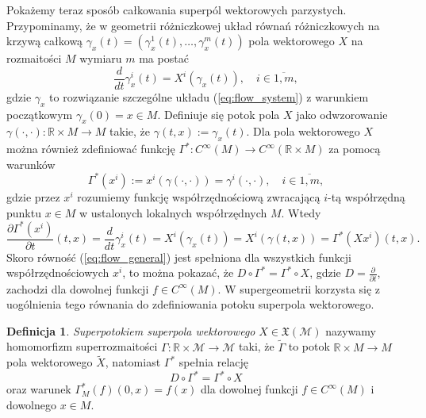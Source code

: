 \documentclass[11pt,a4paper]{report}
\theoremstyle{definition}
\newtheorem{definition}[theorem]{Definicja}
\begin{document}
Pokażemy teraz sposób całkowania superpól wektorowych parzystych. Przypominamy, że w geometrii różniczkowej układ równań różniczkowych na krzywą całkową $\gamma_x (t) = (\gamma_x ^1(t), \ldots, \gamma_x ^m (t))$ pola wektorowego $X$ na rozmaitości $M$ wymiaru $m$ ma postać
\begin{equation}
\label{eq:flow_system}
 \frac{d}{dt}\gamma_{x}^i(t)=X^i(\gamma_{x}(t)), \quad i \in \overline{1,m},
\end{equation}
gdzie $\gamma_{x}$ to rozwiązanie szczególne układu (\ref{eq:flow_system}) z warunkiem początkowym $\gamma_x(0) = x \in M.$ Definiuje się potok pola $X$ jako odwzorowanie $\gamma(\cdot, \cdot): \mathbb{R} \times M \rightarrow M$ takie, że $\gamma(t, x) := \gamma_x (t).$ Dla pola wektorowego $X$ można również zdefiniować funkcję $\Gamma^* : C^\infty (M) \rightarrow C^\infty (\mathbb{R} \times M)$ za pomocą warunków
\begin{equation*}
 \Gamma^*(x^i) := x^i(\gamma(\cdot, \cdot)) =  \gamma^i(\cdot, \cdot), \quad i \in \overline{1,m},
\end{equation*}
gdzie przez $x^i$ rozumiemy funkcję współrzędnościową zwracającą $i$-tą współrzędną punktu $x\in M$ w ustalonych lokalnych współrzędnych $M$. Wtedy
\begin{equation}
\label{eq:flow_general}
\frac{\partial \Gamma^*(x^i)}{\partial t}(t, x) 
= \frac{d}{dt} \gamma^i_x(t) = X^i(\gamma_x(t)) = X^i(\gamma(t,x))=\Gamma^*(Xx^i) (t,x). 
\end{equation}
Skoro równość (\ref{eq:flow_general}) jest spełniona dla wszystkich funkcji współrzędnościowych $x^i$, to można pokazać, że $D\circ \Gamma^*=\Gamma^*\circ X$, gdzie $D = \frac{\partial}{\partial t}$, zachodzi dla dowolnej funkcji $f \in C^\infty(M)$. W supergeometrii korzysta się z uogólnienia tego równania do zdefiniowania potoku superpola wektorowego.
 
\begin{definition}
 \textit{Superpotokiem superpola wektorowego} $X \in \mathfrak{X}(\mathcal{M})$ nazywamy homomorfizm superrozmaitości $\Gamma : \mathbb{R} \times \mathcal{M} \rightarrow \mathcal{M}$ taki, że $\widetilde \Gamma$ to potok $\mathbb{R} \times M \rightarrow M$ pola wektorowego $\widetilde X$, natomiast $\Gamma^*$ spełnia relację
 \begin{equation*}
  D\circ \Gamma^*=\Gamma^*\circ X
 \end{equation*}
 oraz warunek $\Gamma^*_{M} (f )(0,x) = f(x)$ dla dowolnej funkcji $f \in C^\infty (M)$ i dowolnego $x \in M.$
\end{definition}
 
\end{document}
